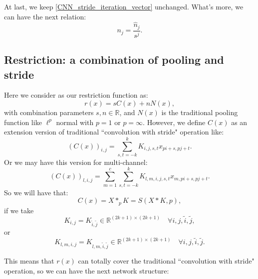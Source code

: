 At last, we keep \eqref{CNN_stride_iteration_vector} unchanged. What's more, we can have the next relation:
\begin{equation}
n_j = \frac{\hat n_j}{s^j}.
\end{equation}
 



\newpage
\subsection{Restriction: a combination of pooling and stride}
Here we consider as our restriction function as:
\begin{equation}
r(x) = sC(x) + nN(x),
\end{equation}
with combination parameters $s, n \in \mathbb R$, and $N(x)$ is the traditional pooling function like $\ell^{p}$ normal with $p = 1$ or $p = \infty$. However, we define $C(x)$ as an extension version of traditional ``convolution with stride" operation like:
\begin{equation}
(C(x))_{i,j} = \sum_{s,t = -k}^{k}K_{i,j,s,t}x_{pi + s, pj + t}.
\end{equation}
Or we may have this version for multi-channel:
\begin{equation}
(C(x))_{l,i,j} = \sum_{m=1}^c\sum_{s,t = -k}^{k}K_{l,m,i,j,s,t}x_{m,pi + s, pj + t}.
\end{equation}
So we will have that:
\begin{equation}
C(x) = X \ast_p K = S(X\ast K, p),
\end{equation}
if we take 
\begin{equation}
K_{i,j} = K_{\tilde i, \tilde j} \in \mathbb R^{(2k+1) \times (2k+1)}\quad  \forall i, j, \tilde i, \tilde j,
\end{equation}
or 
\begin{equation}
K_{l,m,i,j} = K_{l,m,\tilde i, \tilde j} \in \mathbb R^{(2k+1) \times (2k+1)}\quad  \forall i, j, \tilde i, \tilde j.
\end{equation}

This means that $r(x)$ can totally cover the traditional ``convolution with stride" operation, so we can have the next network structure:


